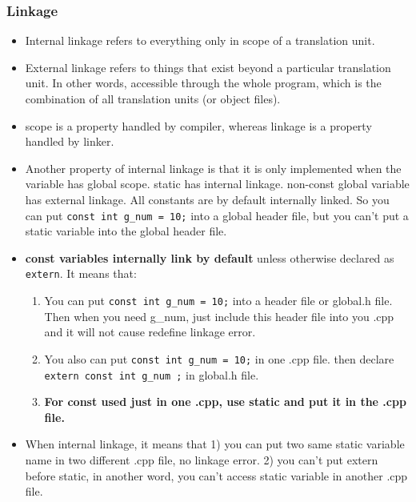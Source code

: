 \documentclass[a4paper,12pt,twoside]{book}
\begin{document}
\subsubsection{Linkage}
\begin{itemize}
	\item Internal linkage refers to everything only in scope of a translation unit.
	
	\item External linkage refers to things that exist beyond a particular translation unit. In other words, accessible through the whole program, which is the combination of all translation units (or object files).
	
	\item scope is a property handled by compiler, whereas linkage is a property handled by linker.
	
	\item Another property of internal linkage is that it is only implemented when the variable has global scope. static has internal linkage. non-const global variable has external linkage. All constants are by default internally linked. So you can put \texttt{const int g\_num = 10;} into a global header file, but you can't put a static variable into the global header file.
	
	\item \textbf{const variables internally link by default} unless otherwise declared as \texttt{extern}. It means that:
	
	\begin{enumerate}
		\item You can put \texttt{const int g\_num = 10;} into a header file or global.h file. Then when you need g\_num, just include this header file into you .cpp and it will not cause redefine linkage error.
		
		\item You also can put \texttt{const int g\_num = 10;} in one .cpp file. then declare \texttt{extern const int g\_num ;} in global.h file.
		
		\item \textbf{For const used just in one .cpp, use static and put it in the .cpp file.}
	\end{enumerate}
	
	\item When internal linkage, it means that 1) you can put two same static variable name in two different .cpp file, no linkage error. 2) you can't put extern before static, in another word, you can't access static variable in another .cpp file. 
\end{itemize}
\end{document}
